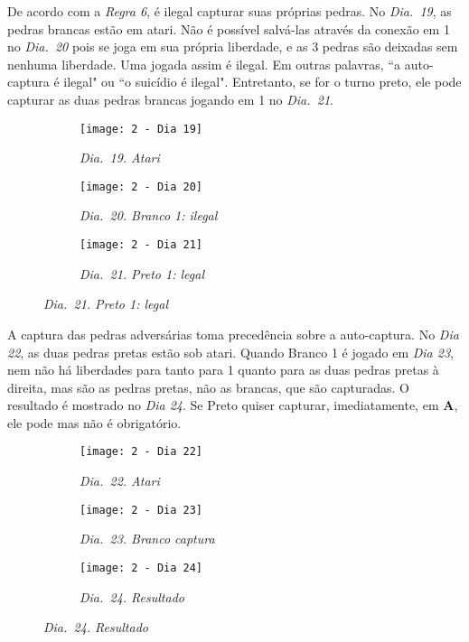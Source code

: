 De acordo com a \emph{Regra 6}, é ilegal capturar suas próprias pedras. No \emph{Dia.\@~19}, as pedras brancas estão em atari. Não é possível salvá-las através da conexão em 1 no \emph{Dia.\@~20} pois se joga em sua própria liberdade, e as 3 pedras são deixadas sem nenhuma liberdade. Uma jogada assim é ilegal. Em outras palavras, ``a auto-captura é ilegal" ou ``o suicídio é ilegal". Entretanto, se for o turno preto, ele pode capturar as duas pedras brancas jogando em 1 no \emph{Dia.\@~21}.

\begin{figure}[h]
    \centering
    \begin{subfigure}[t]{.3\textwidth}
        \centering
        \texttt{[image: 2 - Dia 19]}
        \caption*{\emph{Dia.\@~19. Atari}}
    \end{subfigure}
    \hfill
    \begin{subfigure}[t]{.3\textwidth}
        \centering
        \texttt{[image: 2 - Dia 20]}
        \caption*{\emph{Dia.\@~20. Branco 1: ilegal}}
    \end{subfigure}
    \hfill
    \begin{subfigure}[t]{.3\textwidth}
        \centering
        \texttt{[image: 2 - Dia 21]}
        \caption*{\emph{Dia.\@~21. Preto 1: legal}}
    \end{subfigure}
\end{figure}

\pagebreak

A captura das pedras adversárias toma precedência sobre a auto-captura. No \emph{Dia 22}, as duas pedras pretas estão sob atari. Quando Branco 1 é jogado em \emph{Dia 23}, nem não há liberdades para tanto para 1 quanto para as duas pedras pretas à direita, mas são as pedras pretas, não as brancas, que são capturadas. O resultado é mostrado no \emph{Dia 24}. Se Preto quiser capturar, imediatamente, em \textbf{A}, ele pode mas não é obrigatório.

\begin{figure}[h]
    \centering
    \begin{subfigure}[t]{.3\textwidth}
        \centering
        \texttt{[image: 2 - Dia 22]}
        \caption*{\emph{Dia.\@~22. Atari}}
    \end{subfigure}
    \hfill
    \begin{subfigure}[t]{.3\textwidth}
        \centering
        \texttt{[image: 2 - Dia 23]}
        \caption*{\emph{Dia.\@~23. Branco captura}}
    \end{subfigure}
    \hfill
    \begin{subfigure}[t]{.3\textwidth}
        \centering
        \texttt{[image: 2 - Dia 24]}
        \caption*{\emph{Dia.\@~24. Resultado}}
    \end{subfigure}
\end{figure}


